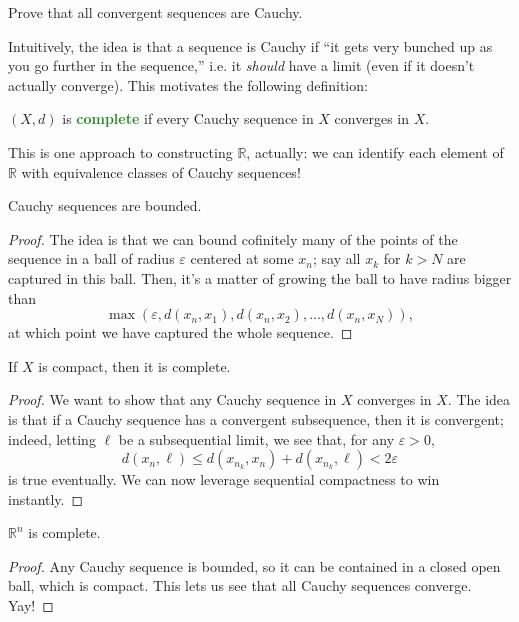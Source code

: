 \documentclass[10pt]{scrartcl}
\providecommand{\eps}{\varepsilon}
\providecommand{\RR}{\mathbb R}
\providecommand{\vocab}[1]{{\textbf{\textcolor{ForestGreen}{#1}}}}
\begin{document}
\begin{exercise}
	Prove that all convergent sequences are Cauchy.
\end{exercise}

Intuitively, the idea is that a sequence is Cauchy if
``it gets very bunched up as you go further in the sequence,''
i.e. it \emph{should} have a limit (even if it doesn't actually converge).
This motivates the following definition:
\begin{definition}[Completeness]\label{wk10:def:completeness}
	$(X, d)$ is \vocab{complete} if every Cauchy sequence in $X$
	converges in $X$.
\end{definition}

This is one approach to constructing $\RR$, actually:
we can identify each element of $\RR$ with equivalence classes
of Cauchy sequences!

\begin{lemma}\label{wk10:lemma:cauchybounded}
	Cauchy sequences are bounded.
\end{lemma}
\begin{proof}
	The idea is that we can bound cofinitely many of the points of the sequence
	in a ball of radius $\eps$ centered at some $x_n$;
	say all $x_k$ for $k > N$ are captured in this ball.
	Then, it's a matter of growing the ball to have radius bigger than
	\[\max(\eps, d(x_n, x_1), d(x_n, x_2), \dots, d(x_n, x_N)),\]
	at which point we have captured the whole sequence.
\end{proof}

\begin{theorem}\label{wk10:thm:seqcomp-impl-complete}
	If $X$ is compact, then it is complete.
\end{theorem}

\begin{proof}
	We want to show that any Cauchy sequence in $X$ converges in $X$.
	The idea is that if a Cauchy sequence has a convergent subsequence,
	then it is convergent; indeed, letting $\ell$ be a subsequential limit,
	we see that, for any $\eps > 0$,
	\[d(x_n, \ell) \le d(x_{n_k}, x_n) + d(x_{n_k}, \ell) < 2\eps\]
	is true eventually.
	We can now leverage sequential compactness to win instantly.
\end{proof}

\begin{theorem}\label{wk10:thm:Rn-complete}
	$\RR^n$ is complete.
\end{theorem}
\begin{proof}
	Any Cauchy sequence is bounded, so it can be contained in
	a closed open ball, which is compact.
	This lets us see that all Cauchy sequences converge. Yay!
\end{proof}
\end{document}
